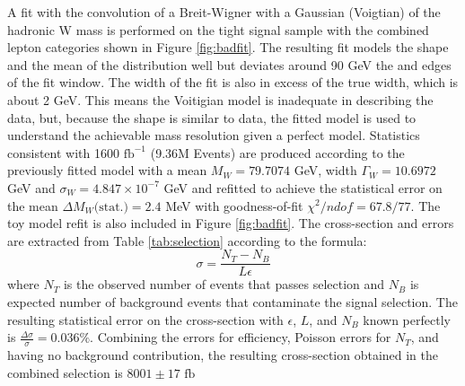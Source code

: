 A fit with the convolution of a Breit-Wigner with a Gaussian (Voigtian) of the hadronic W mass is performed on the tight signal sample with the combined lepton categories shown in Figure \ref{fig:badfit}. The resulting fit models the shape and the mean of the distribution well but deviates around 90 GeV the and edges of the fit window. The width of the fit is also in excess of the true width, which is about 2 GeV. This means the Voitigian model is inadequate in describing  the data, but, because the shape is similar to data, the fitted model is used to understand the achievable mass resolution given a perfect model. Statistics consistent with 1600 $\text{fb}^{-1}$ (9.36M Events) are produced according to the previously fitted model with a mean  $M_W = 79.7074$ GeV, width $\Gamma_W = 10.6972$ GeV and $\sigma_W = 4.847 \times 10^{-7}$ GeV and refitted to achieve the statistical error on the mean $\Delta M_W \text{(stat.)} = 2.4$ MeV with goodness-of-fit $\chi^2 / ndof = 67.8/77$. The toy model refit is also included in Figure \ref{fig:badfit}.
The cross-section and errors are extracted from Table \ref{tab:selection} according to the formula:
\begin{equation}
\sigma = \frac{N_T - N_B}{L \epsilon}
\end{equation}
where $N_T$ is the observed number of events that passes selection and $N_B$ is expected number of background events that contaminate the signal selection. The resulting statistical error on the cross-section with $\epsilon$, $L$, and $N_B$ known perfectly is $\frac{\Delta \sigma}{\sigma} = 0.036 \%$. Combining the errors for efficiency, Poisson errors for $N_T$, and having  no background contribution, the resulting cross-section obtained in the combined selection is $8001 \pm 17 \, \, \text{fb}$
